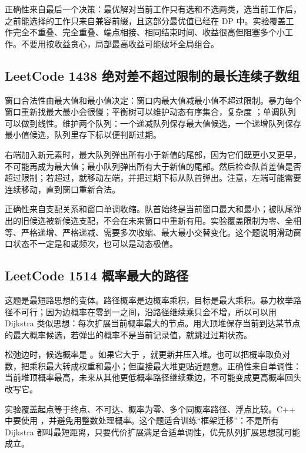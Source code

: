 正确性来自最后一个决策：最优解对当前工作只有选和不选两类，选当前工作后，之前能选择的工作只来自兼容前缀，且这部分最优值已经在 DP 中。实验覆盖工作完全不重叠、完全重叠、端点相接、相同结束时间、收益很高但阻塞多个小工作。不要用按收益贪心，局部最高收益可能破坏全局组合。

\subsection{LeetCode 1438 绝对差不超过限制的最长连续子数组}

窗口合法性由最大值和最小值决定：窗口内最大值减最小值不超过限制。暴力每个窗口重新找最大最小会很慢；平衡树可以维护动态有序集合，复杂度 ；单调队列可以做到线性。维护两个队列：一个递减队列保存最大值候选，一个递增队列保存最小值候选，队列里存下标以便判断过期。

右端加入新元素时，最大队列弹出所有小于新值的尾部，因为它们既更小又更早，不可能再成为最大值；最小队列弹出所有大于新值的尾部。然后检查队首差值是否超过限制；若超过，就移动左端，并把过期下标从队首弹出。注意，左端可能需要连续移动，直到窗口重新合法。

正确性来自支配关系和窗口单调收缩。队首始终是当前窗口最大和最小；被队尾弹出的旧候选被新候选支配，不会在未来窗口中重新有用。实验覆盖限制为零、全相等、严格递增、严格递减、需要多次收缩、最大最小交替变化。这个题说明滑动窗口状态不一定是和或频次，也可以是动态极值。

\subsection{LeetCode 1514 概率最大的路径}

这题是最短路思想的变体。路径概率是边概率乘积，目标是最大乘积。暴力枚举路径不可行；因为边概率在零到一之间，沿路径继续乘只会不增，所以可以用 Dijkstra 类似思想：每次扩展当前概率最大的节点。用大顶堆保存当前到达某节点的最大概率候选，若弹出的概率不是当前记录值，就跳过过期状态。

松弛边时，候选概率是 。如果它大于 ，就更新并压入堆。也可以把概率取负对数，把乘积最大转成权重和最小；但直接最大堆更贴近题意。正确性来自单调性：当前堆顶概率最高，未来从其他更低概率路径继续乘边，不可能变成更高概率回头改写它。

实验覆盖起点等于终点、不可达、概率为零、多个同概率路径、浮点比较。C++ 中要使用 ，并避免用整数处理概率。这个题适合训练“框架迁移”：不是所有 Dijkstra 都叫最短距离，只要代价扩展满足合适单调性，优先队列扩展思想就可能成立。

